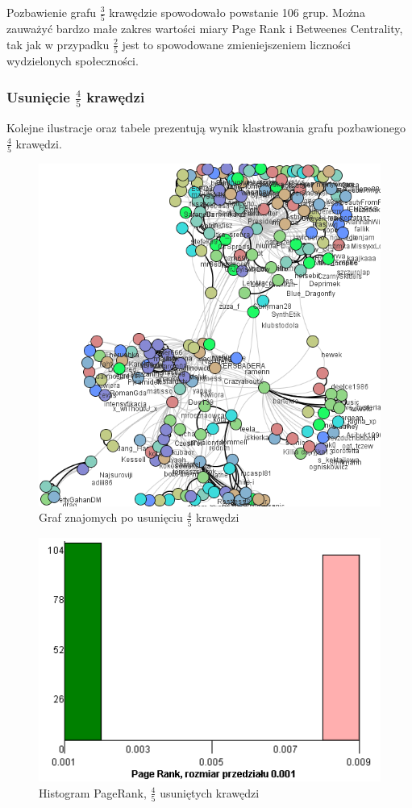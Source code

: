 \documentclass[10pt,a4paper]{article}
\begin{document}
Pozbawienie grafu $\frac{3}{5}$ krawędzie spowodowało powstanie 106 grup. Można zauważyć bardzo małe zakres wartości miary Page Rank i Betweenes Centrality, tak jak w przypadku $\frac{2}{5}$ jest to spowodowane zmieniejszeniem liczności wydzielonych społeczności.

\subsubsection {Usunięcie $\frac{4}{5}$ krawędzi}
Kolejne ilustracje oraz tabele prezentują wynik klastrowania grafu pozbawionego  $\frac{4}{5}$  krawędzi.
\begin{figure}[H]
\centering
\caption{Graf znajomych po usunięciu $\frac{4}{5}$ krawędzi}
\includegraphics[scale=0.6]{wyniki/final200Friends/4200friends.png}
\end{figure}

\begin{figure}[H]
\centering
\caption{Histogram PageRank, $\frac{4}{5}$ usuniętych krawędzi}
\includegraphics[scale=0.6]{wyniki/final200Friends/4200friendsPRHist.png}
\end{figure}
\end{document}
